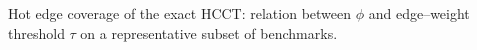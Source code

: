 \label{fig:hcct-coverage} Hot edge coverage of the exact HCCT: relation between $\phi$ and edge--weight threshold $\tau$ on a representative subset of benchmarks.
